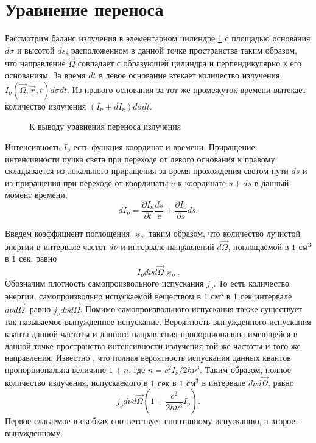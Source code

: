 \section{Уравнение переноса}
Рассмотрим баланс излучения в элементарном цилиндре \ref{fig:1} с площадью основания $d\sigma$ и высотой $ds$, расположенном в данной точке пространства таким образом, что направление $\vec\Omega$ совпадает с образующей цилиндра и перпендикулярно к его основаниям. За время $dt$ в левое основание втекает количество излучения $I_{\nu} (\vec\Omega, \vec r,t)d\sigma dt$. Из правого основания за тот же промежуток времени вытекает количество излучения $(I_{\nu} + dI_{\nu})d \sigma dt$.

\begin{figure}[bh]
\caption{К выводу уравнения переноса излучения}
\label{fig:1}
\end{figure}

Интенсивность $I_{\nu}$ есть функция координат и времени. Приращение интенсивности пучка света при переходе от левого основания к правому складывается из локального приращения за время прохождения светом пути $ds$ и из приращения при переходе от координаты $s$ к координате $s+ds$ в данный момент времени, 
\begin {equation}
dI_{\nu}  = \frac{\partial I_{\nu}}{\partial t } \frac{ds}{c}+\frac{\partial I_{\nu}}{\partial s}ds.
\end {equation}

Введем коэффициент поглощения $\varkappa_\nu$ таким образом, что количество лучистой энергии в интервале частот $d\nu$ и интервале направлений $d\vec\Omega$, поглощаемой в $1 \text{ см}^3$ в  $1 \text{ сек}$, равно
\begin {equation}
I_{\nu}d\nu d\vec\Omega \varkappa_{\nu}.
\label {3}
\end {equation}
Обозначим плотность самопроизвольного испускания $j_\nu$. То есть количество энергии, самопроизвольно испускаемой веществом  в $1 \text{ см}^3$ в  $1 \text{ сек}$ интервале $d\nu d\vec\Omega$, равно $j_{\nu}d\nu d\vec\Omega$. Помимо самопроизвольного испускания также существует так называемое вынужденное испускание. Вероятность вынужденного испускания кванта данной частоты и данного направления пропорциональна имеющейся в данной точке пространства интенсивности излучения той же частоты и того же направления. Известно \cite{zeld_2013}, что полная вероятность испускания данных квантов пропорциональна величине $1+n$, где $n = c^2I_{\nu}/2h\nu^3$. Таким образом, полное количество излучения, испускаемого в $1 \text{ сек}$ в $1 \text{ см}^3$ в интервале $d\nu d\vec\Omega$, равно 
\begin {equation}
j_{\nu} d\nu d\vec\Omega \left(1+\frac{c^2}{2h\nu^3}I_{\nu}\right).
\label{4}
\end {equation}
Первое слагаемое в скобках соответствует спонтанному испусканию, а второе - вынужденному. 

